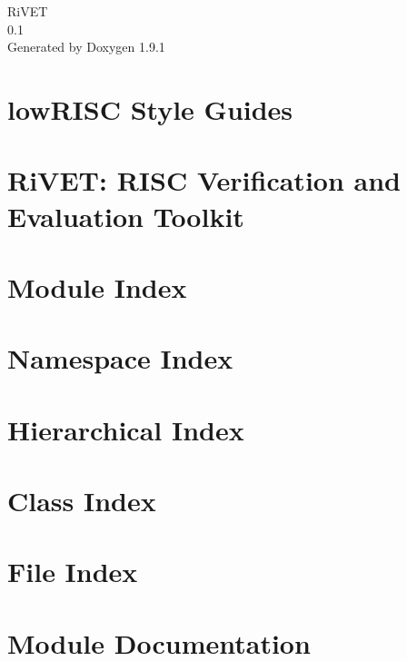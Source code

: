 \let\mypdfximage\pdfximage\def\pdfximage{\immediate\mypdfximage}\documentclass[twoside]{book}
\newcommand{\+}{\discretionary{\mbox{\scriptsize$\hookleftarrow$}}{}{}}
\newcommand{\clearemptydoublepage}{%
  \newpage{\pagestyle{empty}\cleardoublepage}%
}
\begin{document}
\raggedbottom

\hypersetup{pageanchor=false,
             bookmarksnumbered=true,
             pdfencoding=unicode
            }
\begin{titlepage}
\vspace*{7cm}
\begin{center}%
{\Large Ri\+VET \\[1ex]\large 0.\+1 }\\
\vspace*{1cm}
{\large Generated by Doxygen 1.9.1}\\
\end{center}
\end{titlepage}
\clearemptydoublepage
{}
\tableofcontents
\clearemptydoublepage
{}
\hypersetup{pageanchor=true}

\chapter{low\+RISC Style Guides}
\label{md_docs_style_guides_README}

\chapter{Ri\+VET\+: RISC Verification and Evaluation Toolkit}
\label{md_README}

\chapter{Module Index}

\chapter{Namespace Index}

\chapter{Hierarchical Index}

\chapter{Class Index}

\chapter{File Index}

\chapter{Module Documentation}



\end{document}
